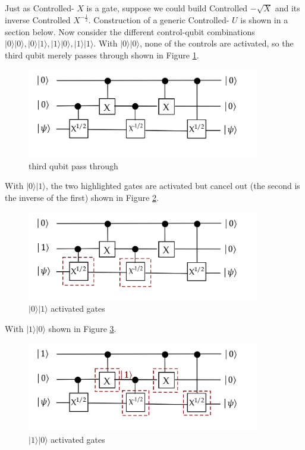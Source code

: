 \documentclass[main.tex]{subfiles}
\begin{document}
    Just as Controlled- $X$ is a gate, suppose we could build Controlled $-\sqrt{X}$ and its inverse Controlled $X^{-\frac{1}{2}}$. Construction of a generic Controlled- $U$ is shown in a section below. Now consider the different control-qubit combinations $|0\rangle|0\rangle,|0\rangle|1\rangle,|1\rangle|0\rangle,|1\rangle|1\rangle$. With $|0\rangle|0\rangle$, none of the controls are activated, so the third qubit merely passes through shown in Figure \ref{fig:35ccnot5}.
    
    \begin{figure}
        \centering
        \includegraphics[width=4in]{notes/figs/n08/35ccnot5.png}
        \caption{third qubit pass through}
        \label{fig:35ccnot5}
    \end{figure}

    With $|0\rangle|1\rangle$, the two highlighted gates are activated but cancel out (the second is the inverse of the first) shown in Figure \ref{fig:36ccnot6}.
    
    \begin{figure}
        \centering
        \includegraphics[width=4in]{notes/figs/n08/36ccnot6.png}
        \caption{$|0\rangle|1\rangle$ activated gates}
        \label{fig:36ccnot6}
    \end{figure}
    
    With $|1\rangle|0\rangle$ shown in Figure \ref{fig:37ccnot7}.
    
    \begin{figure}
        \centering
        \includegraphics[width=4in]{notes/figs/n08/37ccnot7.png}
        \caption{$|1\rangle|0\rangle$ activated gates}
        \label{fig:37ccnot7}
    \end{figure}
    
\end{document}
